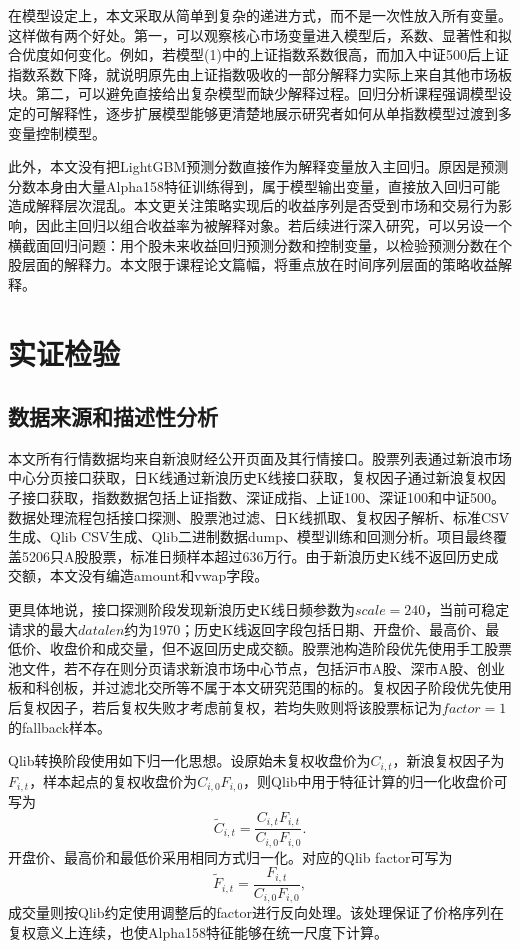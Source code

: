 \documentclass[UTF8,a4paper,12pt]{ctexart}
\begin{document}
在模型设定上，本文采取从简单到复杂的递进方式，而不是一次性放入所有变量。这样做有两个好处。第一，可以观察核心市场变量进入模型后，系数、显著性和拟合优度如何变化。例如，若模型(1)中的上证指数系数很高，而加入中证500后上证指数系数下降，就说明原先由上证指数吸收的一部分解释力实际上来自其他市场板块。第二，可以避免直接给出复杂模型而缺少解释过程。回归分析课程强调模型设定的可解释性，逐步扩展模型能够更清楚地展示研究者如何从单指数模型过渡到多变量控制模型。

此外，本文没有把LightGBM预测分数直接作为解释变量放入主回归。原因是预测分数本身由大量Alpha158特征训练得到，属于模型输出变量，直接放入回归可能造成解释层次混乱。本文更关注策略实现后的收益序列是否受到市场和交易行为影响，因此主回归以组合收益率为被解释对象。若后续进行深入研究，可以另设一个横截面回归问题：用个股未来收益回归预测分数和控制变量，以检验预测分数在个股层面的解释力。本文限于课程论文篇幅，将重点放在时间序列层面的策略收益解释。

\section{实证检验}
\subsection{数据来源和描述性分析}
本文所有行情数据均来自新浪财经公开页面及其行情接口\cite{sinafinance}。股票列表通过新浪市场中心分页接口获取，日K线通过新浪历史K线接口获取，复权因子通过新浪复权因子接口获取，指数数据包括上证指数、深证成指、上证100、深证100和中证500。数据处理流程包括接口探测、股票池过滤、日K线抓取、复权因子解析、标准CSV生成、Qlib CSV生成、Qlib二进制数据dump、模型训练和回测分析。项目最终覆盖5206只A股股票，标准日频样本超过636万行。由于新浪历史K线不返回历史成交额，本文没有编造amount和vwap字段。

更具体地说，接口探测阶段发现新浪历史K线日频参数为$scale=240$，当前可稳定请求的最大$datalen$约为1970；历史K线返回字段包括日期、开盘价、最高价、最低价、收盘价和成交量，但不返回历史成交额。股票池构造阶段优先使用手工股票池文件，若不存在则分页请求新浪市场中心节点，包括沪市A股、深市A股、创业板和科创板，并过滤北交所等不属于本文研究范围的标的。复权因子阶段优先使用后复权因子，若后复权失败才考虑前复权，若均失败则将该股票标记为$factor=1$的fallback样本。

Qlib转换阶段使用如下归一化思想。设原始未复权收盘价为$C_{i,t}$，新浪复权因子为$F_{i,t}$，样本起点的复权收盘价为$C_{i,0}F_{i,0}$，则Qlib中用于特征计算的归一化收盘价可写为
\begin{equation}
\tilde{C}_{i,t}=\frac{C_{i,t}F_{i,t}}{C_{i,0}F_{i,0}}.
\end{equation}
开盘价、最高价和最低价采用相同方式归一化。对应的Qlib factor可写为
\begin{equation}
\tilde{F}_{i,t}=\frac{F_{i,t}}{C_{i,0}F_{i,0}},
\end{equation}
成交量则按Qlib约定使用调整后的factor进行反向处理。该处理保证了价格序列在复权意义上连续，也使Alpha158特征能够在统一尺度下计算。
\end{document}
